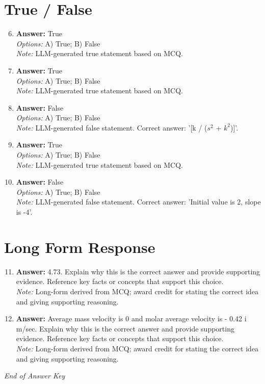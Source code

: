 \documentclass[12pt]{article}
\begin{document}
\section*{True / False}
\begin{enumerate}[label=\arabic*.]
\setcounter{enumi}{5}
\item \textbf{Answer:} True
\\ \textit{Options:} A) True; B) False
\\ \textit{Note:} LLM-generated true statement based on MCQ.
\item \textbf{Answer:} True
\\ \textit{Options:} A) True; B) False
\\ \textit{Note:} LLM-generated true statement based on MCQ.
\item \textbf{Answer:} False
\\ \textit{Options:} A) True; B) False
\\ \textit{Note:} LLM-generated false statement. Correct answer: '[k / ($s^2$ + $k^2$)]'.
\item \textbf{Answer:} True
\\ \textit{Options:} A) True; B) False
\\ \textit{Note:} LLM-generated true statement based on MCQ.
\item \textbf{Answer:} False
\\ \textit{Options:} A) True; B) False
\\ \textit{Note:} LLM-generated false statement. Correct answer: 'Initial value is 2, slope is -4'.
\end{enumerate}

\section*{Long Form Response}
\begin{enumerate}[label=\arabic*.]
\setcounter{enumi}{10}
\item \textbf{Answer:} 4.73. Explain why this is the correct answer and provide supporting evidence. Reference key facts or concepts that support this choice.
\\ \textit{Note:} Long-form derived from MCQ; award credit for stating the correct idea and giving supporting reasoning.
\item \textbf{Answer:} Average mass velocity is 0 and molar average velocity is - 0.42 i m/sec. Explain why this is the correct answer and provide supporting evidence. Reference key facts or concepts that support this choice.
\\ \textit{Note:} Long-form derived from MCQ; award credit for stating the correct idea and giving supporting reasoning.
\end{enumerate}

\vfill
\noindent\textit{End of Answer Key}
\end{document}
